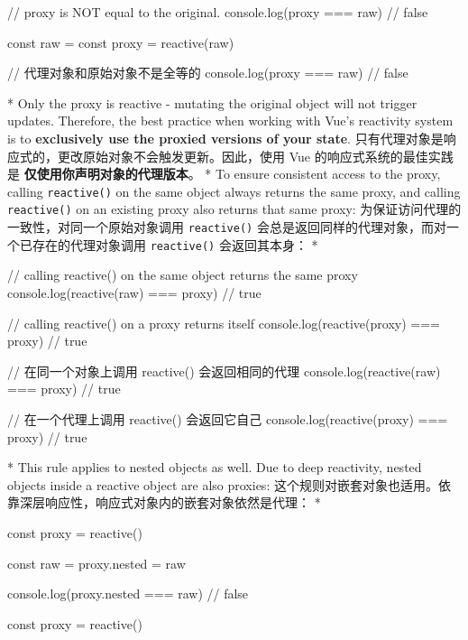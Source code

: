 \begin{paracol}{2}
\begin{codeJs}
// proxy is NOT equal to the original.
console.log(proxy === raw) // false    
\end{codeJs}
\switchcolumn
\begin{codeJs}
const raw = {}
const proxy = reactive(raw)

// 代理对象和原始对象不是全等的
console.log(proxy === raw) // false
\end{codeJs} 

\switchcolumn[0]*%
Only the proxy is reactive - mutating the original object will not
trigger updates. Therefore, the best practice when working with Vue's
reactivity system is to \textbf{exclusively use the proxied versions of
your state}.
\switchcolumn
只有代理对象是响应式的，更改原始对象不会触发更新。因此，使用 Vue
的响应式系统的最佳实践是 \textbf{仅使用你声明对象的代理版本}。
\switchcolumn[0]*%
To ensure consistent access to the proxy, calling \texttt{reactive()} on
the same object always returns the same proxy, and calling
\texttt{reactive()} on an existing proxy also returns that same proxy:
\switchcolumn
为保证访问代理的一致性，对同一个原始对象调用 \texttt{reactive()}
会总是返回同样的代理对象，而对一个已存在的代理对象调用
\texttt{reactive()} 会返回其本身：
\switchcolumn[0]*%
\begin{codeJs}
// calling reactive() on the same object returns the same proxy
console.log(reactive(raw) === proxy) // true

// calling reactive() on a proxy returns itself
console.log(reactive(proxy) === proxy) // true
\end{codeJs}
\switchcolumn
\begin{codeJs}
// 在同一个对象上调用 reactive() 会返回相同的代理
console.log(reactive(raw) === proxy) // true

// 在一个代理上调用 reactive() 会返回它自己
console.log(reactive(proxy) === proxy) // true
\end{codeJs}
\switchcolumn[0]*%
This rule applies to nested objects as well. Due to deep reactivity,
nested objects inside a reactive object are also proxies:
\switchcolumn
这个规则对嵌套对象也适用。依靠深层响应性，响应式对象内的嵌套对象依然是代理：
\switchcolumn[0]*%
\begin{codeJs}
const proxy = reactive({})

const raw = {}
proxy.nested = raw

console.log(proxy.nested === raw) // false
\end{codeJs}
\switchcolumn
\begin{codeJs}
const proxy = reactive({})


\end{codeJs}
\end{paracol}
